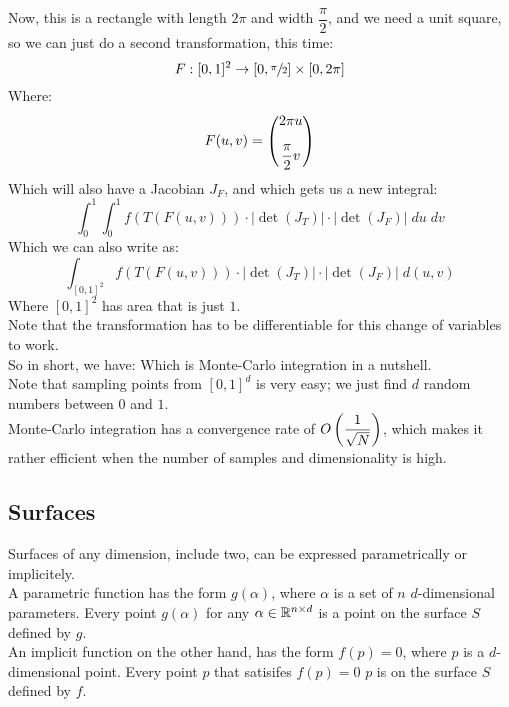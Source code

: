 \documentclass[12pt]{article}
\begin{document}
Now, this is a rectangle with length $2\pi$
and width $\dfrac{\pi}{2}$,
and we need a unit square,
so we can just do a second transformation,
this time:
\[ F: [0, 1]^2 \to [0, \sfrac{\pi}{2}] \times [0, 2\pi] \]
Where:
\[ F(u, v) = \pmat{2\pi u \vs{10} \\ \dfrac{\pi}{2}v} \]
Which will also have a Jacobian $J_F$,
and which gets us a new integral:
\[ \int_0^{1} \int_0^{1} 
f(T(F(u, v))) \cdot
|\det(J_T)| \cdot
|\det(J_F)| \; du \; dv \]
Which we can also write as:
\[ \int_{[0, 1]^2}
f(T(F(u, v))) \cdot
|\det(J_T)| \cdot
|\det(J_F)| \; d(u, v) \]
Where $[0, 1]^2$
has area that is just $1$. \\

Note that the transformation has to be 
differentiable for this change of variables
to work. \\

So in short, we have:
Which is Monte-Carlo integration in a nutshell. \\

Note that sampling points from $[0, 1]^d$
is very easy; we just find $d$ random numbers
between $0$ and $1$. \\

Monte-Carlo integration has a convergence rate
of $O\left( \dfrac{1}{\sqrt{N}} \right)$, which makes it
rather efficient when the number of samples
and dimensionality is high. \\

\newpage

\subsection*{Surfaces}

Surfaces of any dimension, include two,
can be expressed parametrically or implicitely. \\

A parametric function has the form $g(\alpha)$,
where $\alpha$ is a set of $n$ $d$-dimensional 
parameters. Every point $g(\alpha)$ for any 
$\alpha \in \mathbb{R}^{n \times d}$ is a point on the
surface $S$ defined by $g$. \\

An implicit function on the other hand,
has the form $f(p) = 0$,
where $p$ is a $d$-dimensional point. 
Every point $p$ that satisifes 
$f(p) = 0$ $p$ is on the surface $S$ defined by $f$. \\
\end{document}
